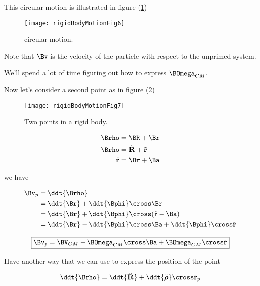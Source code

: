 This circular motion is illustrated in figure (\ref{fig:rigidBodyMotion:rigidBodyMotionFig6})

\begin{figure}[htp]
   \centering
   \texttt{[image: rigidBodyMotionFig6]}
   \caption{circular motion.}\label{fig:rigidBodyMotion:rigidBodyMotionFig6}
\end{figure}

Note that $\Bv$ is the velocity of the particle with respect to the unprimed system.

We'll spend a lot of time figuring out how to express $\BOmega_{CM}$.

Now let's consider a second point as in figure (\ref{fig:rigidBodyMotion:rigidBodyMotionFig7})
\begin{figure}[htp]
   \centering
   \texttt{[image: rigidBodyMotionFig7]}
   \caption{Two points in a rigid body.}\label{fig:rigidBodyMotion:rigidBodyMotionFig7}
\end{figure}

\begin{align}\label{eqn:rigidBodyMotion:220}
\Brho &= \BR + \Br \\
\Brho &= \tilde{\mathbf{R}} + \tilde{\mathbf{r}} \\
\tilde{\mathbf{r}} &= \Br + \Ba
\end{align}

we have

\begin{align*}
\Bv_p
&=
\ddt{\Brho} \\
&= \ddt{\Br} + \ddt{\Bphi} \cross \Br \\
&= \ddt{\Br} + \ddt{\Bphi} \cross (\tilde{\mathbf{r}} - \Ba) \\
&= \ddt{\Br} - \ddt{\Bphi} \cross \Ba + \ddt{\Bphi} \cross \tilde{\mathbf{r}} 
\end{align*}

\begin{equation}\label{eqn:rigidBodyMotion:240}
\boxed{
\Bv_p = \BV_{CM} - 
\BOmega_{CM} \cross \Ba
+\BOmega_{CM} \cross \tilde{\mathbf{r}}
}
\end{equation}

Have another way that we can use to express the position of the point 

\begin{equation}\label{eqn:rigidBodyMotion:260}
\ddt{\Brho} 
= \ddt{\tilde{\mathbf{R}}} + \ddt{\tilde{\boldsymbol{\rho}}} \cross \tilde{\mathbf{r}}_p 
\end{equation}

